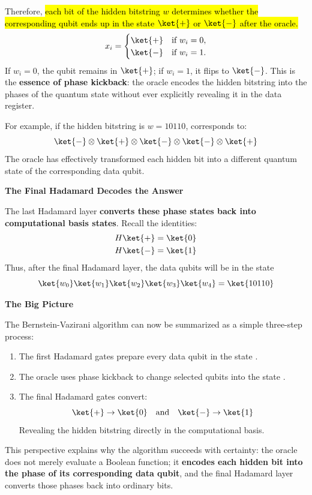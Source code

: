 Therefore, \hl{each bit of the hidden bitstring $w$ determines whether the corresponding qubit ends up in the state $\ket{+}$ or $\ket{-}$ after the oracle.}
\begin{equation}
    x_i = \begin{cases}
        \ket{+} & \text{if } w_i = 0, \\
        \ket{-} & \text{if } w_i = 1.
    \end{cases}
\end{equation}
If $w_i = 0$, the qubit remains in $\ket{+}$; if $w_i = 1$, it flips to $\ket{-}$. This is the \textbf{essence of phase kickback}: the oracle encodes the hidden bitstring into the phases of the quantum state without ever explicitly revealing it in the data register.

\highspace
For example, if the hidden bitstring is $w = 10110$, corresponds to:
\begin{equation*}
    \ket{-} \otimes \ket{+} \otimes \ket{-} \otimes \ket{-} \otimes \ket{+}
\end{equation*}
The oracle has effectively transformed each hidden bit into a different quantum state of the corresponding data qubit.

\highspace
\begin{flushleft}
    \textcolor{Green3}{ \textbf{The Final Hadamard Decodes the Answer}}
\end{flushleft}
The last Hadamard layer \textbf{converts these phase states back into computational basis states}. Recall the identities:
\begin{align*}
    H\ket{+} &= \ket{0} \\
    H\ket{-} &= \ket{1}
\end{align*}
Thus, after the final Hadamard layer, the data qubits will be in the state
\begin{equation*}
    \ket{w_0}\ket{w_1}\ket{w_2}\ket{w_3}\ket{w_4} = \ket{10110}
\end{equation*}

\highspace
\begin{flushleft}
    \textcolor{Green3}{ \textbf{The Big Picture}}
\end{flushleft}
The Bernstein-Vazirani algorithm can now be summarized as a simple three-step process:
\begin{enumerate}
    \item The first Hadamard gates prepare every data qubit in the state \ket{+}.
    \item The oracle uses phase kickback to change selected qubits into the state \ket{-}.
    \item The final Hadamard gates convert:
    \begin{equation*}
        \ket{+} \to \ket{0} \quad \text{and} \quad \ket{-} \to \ket{1}
    \end{equation*}
    Revealing the hidden bitstring directly in the computational basis.
\end{enumerate}
This perspective explains why the algorithm succeeds with certainty: the oracle does not merely evaluate a Boolean function; it \textbf{encodes each hidden bit into the phase of its corresponding data qubit}, and the final Hadamard layer converts those phases back into ordinary bits.

